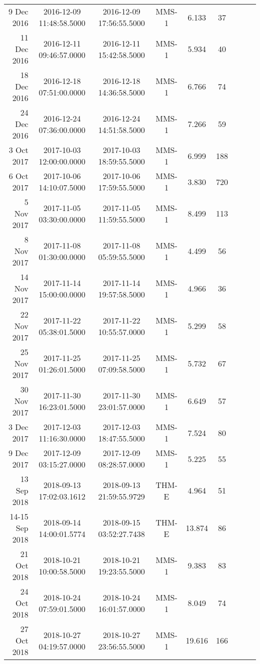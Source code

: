 \begin{longtable}{r|cccccccc}
9 Dec 2016     &  2016-12-09 11:48:58.5000 &  2016-12-09 17:56:55.5000 &  MMS-1 &    6.133 &     37 \\
11 Dec 2016    &  2016-12-11 09:46:57.0000 &  2016-12-11 15:42:58.5000 &  MMS-1 &    5.934 &     40 \\
18 Dec 2016    &  2016-12-18 07:51:00.0000 &  2016-12-18 14:36:58.5000 &  MMS-1 &    6.766 &     74 \\
24 Dec 2016    &  2016-12-24 07:36:00.0000 &  2016-12-24 14:51:58.5000 &  MMS-1 &    7.266 &     59 \\
3 Oct 2017     &  2017-10-03 12:00:00.0000 &  2017-10-03 18:59:55.5000 &  MMS-1 &    6.999 &    188 \\
6 Oct 2017     &  2017-10-06 14:10:07.5000 &  2017-10-06 17:59:55.5000 &  MMS-1 &    3.830 &    720 \\
5 Nov 2017     &  2017-11-05 03:30:00.0000 &  2017-11-05 11:59:55.5000 &  MMS-1 &    8.499 &    113 \\
8 Nov 2017     &  2017-11-08 01:30:00.0000 &  2017-11-08 05:59:55.5000 &  MMS-1 &    4.499 &     56 \\
14 Nov 2017    &  2017-11-14 15:00:00.0000 &  2017-11-14 19:57:58.5000 &  MMS-1 &    4.966 &     36 \\
22 Nov 2017    &  2017-11-22 05:38:01.5000 &  2017-11-22 10:55:57.0000 &  MMS-1 &    5.299 &     58 \\
25 Nov 2017    &  2017-11-25 01:26:01.5000 &  2017-11-25 07:09:58.5000 &  MMS-1 &    5.732 &     67 \\
30 Nov 2017    &  2017-11-30 16:23:01.5000 &  2017-11-30 23:01:57.0000 &  MMS-1 &    6.649 &     57 \\
3 Dec 2017     &  2017-12-03 11:16:30.0000 &  2017-12-03 18:47:55.5000 &  MMS-1 &    7.524 &     80 \\
9 Dec 2017     &  2017-12-09 03:15:27.0000 &  2017-12-09 08:28:57.0000 &  MMS-1 &    5.225 &     55 \\
13 Sep 2018    &  2018-09-13 17:02:03.1612 &  2018-09-13 21:59:55.9729 &  THM-E &    4.964 &     51 \\
14-15 Sep 2018 &  2018-09-14 14:00:01.5774 &  2018-09-15 03:52:27.7438 &  THM-E &   13.874 &     86 \\
21 Oct 2018    &  2018-10-21 10:00:58.5000 &  2018-10-21 19:23:55.5000 &  MMS-1 &    9.383 &     83 \\
24 Oct 2018    &  2018-10-24 07:59:01.5000 &  2018-10-24 16:01:57.0000 &  MMS-1 &    8.049 &     74 \\
27 Oct 2018    &  2018-10-27 04:19:57.0000 &  2018-10-27 23:56:55.5000 &  MMS-1 &   19.616 &    166 \\

\end{longtable}
